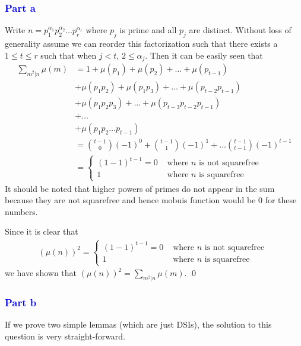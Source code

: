 \documentclass{unswmaths}
\begin{document}
\subsubsection*{\textcolor{blue}{Part a}}
Write $ n = p_1^{\alpha_1} p_2^{\alpha_2} \ldots p_r^{\alpha_r} $ where $ p_j $ 
is prime and all $ p_j $ are distinct.
Without loss of generality assume we can reorder this factorization such that 
there exists a $ 1 \leq t \leq r $ such that
when $ j < t $, $ 2 \leq \alpha_j $.
Then it can be easily seen that
\begin{align*}
    \sum_{m^2 | n } \mu(m) &= 1 + \mu(p_1) + \mu(p_2) + \ldots + \mu(p_{t-1}) \\
        &+ \mu(p_1 p_2) + \mu(p_1 p_3) + \ldots + \mu(p_{t-2} p_{t-1}) \\
        &+ \mu(p_1 p_2 p_3) + \ldots + \mu( p_{t-3} p_{t-2} p_{t-1}) \\
        &+ \ldots \\
        &+ \mu(p_1 p_2 \ldots p_{t-1}) \\
        &=  \binom{t-1}{0}(-1)^{0} + \binom{t-1}{1} (-1)^{1} + \ldots  \binom{t-1}{t-1}(-1)^{t-1} \\
        &= \begin{cases}
               (1-1)^{t-1} = 0 & \text{ where } n \text{ is not squarefree } \\
               1 & \text{ where } n \text{ is squarefree }
           \end{cases}
\end{align*}
It should be noted that higher powers of primes do not appear in the sum
because they are not squarefree and hence mobuis function would be $ 0 $ 
for these numbers.

Since it is clear that 
\begin{align*}
    (\mu(n))^2 = \begin{cases}
        (1-1)^{t-1} = 0 & \text{ where } n \text{ is not squarefree } \\
        1 & \text{ where } n \text{ is squarefree }
    \end{cases}
\end{align*}
we have shown that $ (\mu(n))^2 = \sum_{m^2 | n} \mu(m) $. \qed

\subsubsection*{\textcolor{blue}{Part b}}
If we prove two simple lemmas (which are just DSIs), the solution to this question is very straight-forward. 
\end{document}
